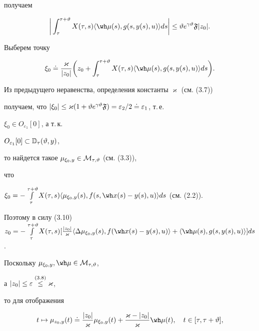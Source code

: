 получаем


$$


\bigg|\int_\tau^{\tau+\vartheta}X(\tau,s)\langle\wh\mu(s),g(s,y(s),u)


\rangle ds\bigg|\le\vartheta e^{\gamma\vartheta}\frak F|z_0|.


$$


Выберем точку


\begin{equation}


\xi_0\doteq\frac{{\varkappa}}{|z_0|}\bigg(z_0+


\int_\tau^{\tau+\vartheta}X(\tau,s)\langle\wh\mu(s),g(s,y(s),u)


\rangle ds\bigg).


\end{equation}


Из предыдущего неравенства, определения константы ${\varkappa}$ (см. (3.7))


получаем, что $|\xi_0|\le\varkappa


(1+\vartheta e^{\gamma \vartheta}\frak F)=


\varepsilon_2/2\doteq\varepsilon_1$, т.\,е.


$\xi_0\in O_{\varepsilon_1}[0]$, а т.\,к.


$O_{\varepsilon_1}[0]\subset\Bbb D_\tau(\vartheta ,y)$,


то найдется такое $\mu_{\xi_0,y}\in\cal M_{\tau,\vartheta}$ (см. (3.3)),


что 


$\xi_0=-\int\limits_\tau^{\tau+\vartheta}X(\tau,s)


\langle\mu_{\xi_0,y}(s),f(s,\wh x(s)-y(s),u)\rangle ds$ (см. (2.2)).


Поэтому в силу (3.10) \ $z_0=-\int\limits_{\tau}^{\tau+\vartheta}X(\tau,s)


[\frac{|z_0|}{{\varkappa}}\langle\Delta\mu_{\xi_0,y}(s),f(\wh x(s)


-y(s),u)\rangle+\langle\wh\mu(s),g(s,y(s),u)\rangle] ds$.


Поскольку $\mu_{\xi_0,y},\wh\mu\in\cal M_{\tau,\vartheta}$,


а $|z_0|\le\varepsilon\overset{(3.8)}{\le}{}\varkappa$,


то для отображения


\begin{equation}


t\mapsto\mu_{z_0,y}(t)\doteq\frac{|z_0|}{\varkappa}\mu_{\xi_0,y}(t)+


\frac{\varkappa-|z_0|}{\varkappa}\wh\mu(t),


\quad t\in[\tau,\tau+\vartheta],


\end{equation}


